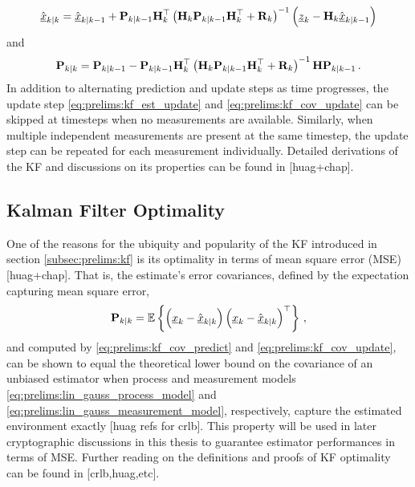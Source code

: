 \begin{equation}\label{eq:prelims:kf_est_update}
    \hat{{\underline{x}}}_{k|k} = \hat{{\underline{x}}}_{k|k-1}+{{\mathbf{P}}}_{k|k-1}{{\mathbf{H}}}_k^\top\left({{\mathbf{H}}}_k{{\mathbf{P}}}_{k|k-1}{{\mathbf{H}}}_k^\top + {{\mathbf{R}}}_k\right)^{-1}\left({\underline{z}}_k-{{\mathbf{H}}}_k\hat{{\underline{x}}}_{k|k-1}\right)
\end{equation}
and
\begin{equation}\label{eq:prelims:kf_cov_update}
    {\ensuremath{{\mathbf{P}}}}_{k|k} = {{\mathbf{P}}}_{k|k-1}-{{\mathbf{P}}}_{k|k-1}{{\mathbf{H}}}_k^\top\left({{\mathbf{H}}}_k{{\mathbf{P}}}_{k|k-1}{{\mathbf{H}}}_k^\top + {{\mathbf{R}}}_k\right)^{-1}{{\mathbf{H}}}{{\mathbf{P}}}_{k|k-1}\,.
\end{equation}
In addition to alternating prediction and update steps as time progresses, the update step \eqref{eq:prelims:kf_est_update} and \eqref{eq:prelims:kf_cov_update} can be skipped at timesteps when no measurements are available. Similarly, when multiple independent measurements are present at the same timestep, the update step can be repeated for each measurement individually. Detailed derivations of the KF and discussions on its properties can be found in [huag+chap].

% 
% 

\subsection{Kalman Filter Optimality}\label{subsec:prelims:kf_opt}
One of the reasons for the ubiquity and popularity of the KF introduced in section \ref{subsec:prelims:kf} is its optimality in terms of mean square error (MSE) [huag+chap]. That is, the estimate's error covariances, defined by the expectation capturing mean square error,
\begin{equation}
    {\ensuremath{{\mathbf{P}}}}_{k|k} = \mathbb{E}\left\{\left({\underline{x}}_k - \hat{{\underline{x}}}_{k|k}\right)\left({\underline{x}}_k - \hat{{\underline{x}}}_{k|k}\right)^\top\right\}\,,
\end{equation}
and computed by \eqref{eq:prelims:kf_cov_predict} and \eqref{eq:prelims:kf_cov_update}, can be shown to equal the theoretical lower bound on the covariance of an unbiased estimator when process and measurement models \eqref{eq:prelims:lin_gauss_process_model} and \eqref{eq:prelims:lin_gauss_measurement_model}, respectively, capture the estimated environment exactly [huag refs for crlb]. This property will be used in later cryptographic discussions in this thesis to guarantee estimator performances in terms of MSE. Further reading on the definitions and proofs of KF optimality can be found in [crlb,huag,etc].

